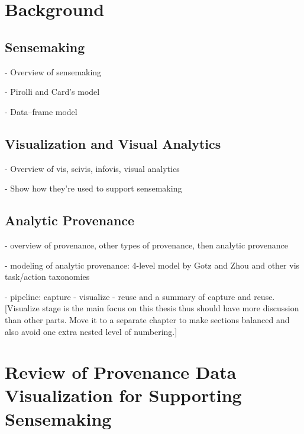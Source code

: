 
\graphicspath{{Chapter2/figures/}}

%
%
%
%


\chapter{Background}
\section{Sensemaking}
- Overview of sensemaking

- Pirolli and Card's model

- Data--frame model

\section{Visualization and Visual Analytics}
- Overview of vis, scivis, infovis, visual analytics

- Show how they're used to support sensemaking

\section{Analytic Provenance}
- overview of provenance, other types of provenance, then analytic provenance

- modeling of analytic provenance: 4-level model by Gotz and Zhou and other vis task/action taxonomies

- pipeline: capture - visualize - reuse and a summary of capture and reuse. [Visualize stage is the main focus on this thesis thus should have more discussion than other parts. Move it to a separate chapter to make sections balanced and also avoid one extra nested level of numbering.]

\chapter{Review of Provenance Data Visualization for Supporting Sensemaking}
